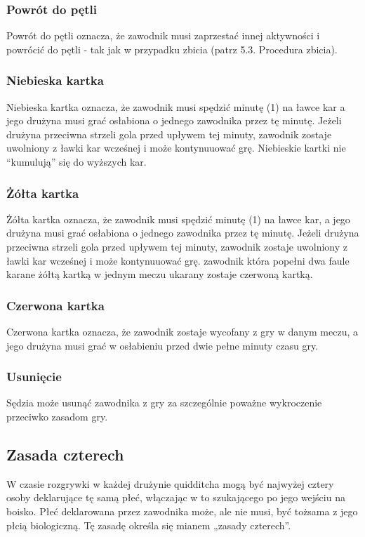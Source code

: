 \documentclass[12pt]{article}
\begin{document}
\subsubsection{Powrót do pętli}
Powrót do pętli oznacza, że
zawodnik musi zaprzestać innej aktywności i powrócić do pętli - tak jak
w przypadku zbicia (patrz 5.3. Procedura zbicia).

\subsubsection{Niebieska kartka}
Niebieska kartka oznacza, że
zawodnik musi spędzić minutę (1) na ławce kar a jego drużyna musi grać
osłabiona o jednego zawodnika przez tę minutę. Jeżeli drużyna przeciwna
strzeli gola przed upływem tej minuty, zawodnik zostaje uwolniony z
ławki kar wcześnej i może kontynuuować grę. Niebieskie kartki nie
``kumulują'' się do wyższych kar.

\subsubsection{Żółta kartka}
Żółta kartka oznacza, że
zawodnik musi spędzić minutę (1) na ławce kar, a jego drużyna musi grać
osłabiona o jednego zawodnika przez tę minutę. Jeżeli drużyna przeciwna
strzeli gola przed upływem tej minuty, zawodnik zostaje uwolniony z
ławki kar wcześnej i może kontynuuować grę. zawodnik która popełni dwa
faule karane żółtą kartką w jednym meczu ukarany zostaje czerwoną
kartką.

\subsubsection{Czerwona kartka}
Czerwona kartka oznacza, że
zawodnik zostaje wycofany z gry w danym meczu, a jego drużyna musi grać
w osłabieniu przed dwie pełne minuty czasu gry.

\subsubsection{Usunięcie}
Sędzia może usunąć zawodnika z gry za
szczególnie poważne wykroczenie przeciwko zasadom gry.

\subsection{Zasada czterech}
W czasie rozgrywki w każdej drużynie quidditcha mogą być najwyżej cztery
osoby deklarujące tę samą płeć, włączając w to szukającego po jego
wejściu na boisko. Płeć deklarowana przez zawodnika może, ale nie musi,
być tożsama z jego płcią biologiczną. Tę zasadę określa się mianem
„zasady czterech''.
\end{document}
